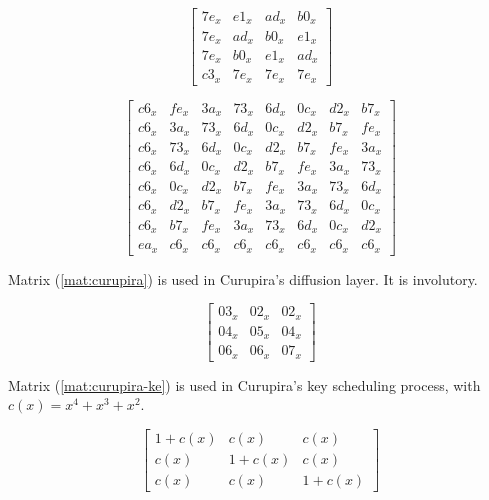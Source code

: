 \documentclass{report}
\begin{document}
\begin{equation}\label{mat:fox-mu4-inv}
\begin{bmatrix}
7e_x & e1_x & ad_x & b0_x\\
7e_x & ad_x & b0_x & e1_x\\
7e_x & b0_x & e1_x & ad_x\\
c3_x & 7e_x & 7e_x & 7e_x
\end{bmatrix}
\end{equation}

\begin{equation}\label{mat:fox-mu8-inv}
\begin{bmatrix}
c6_x & fe_x & 3a_x & 73_x & 6d_x & 0c_x & d2_x & b7_x\\
c6_x & 3a_x & 73_x & 6d_x & 0c_x & d2_x & b7_x & fe_x\\
c6_x & 73_x & 6d_x & 0c_x & d2_x & b7_x & fe_x & 3a_x\\
c6_x & 6d_x & 0c_x & d2_x & b7_x & fe_x & 3a_x & 73_x\\
c6_x & 0c_x & d2_x & b7_x & fe_x & 3a_x & 73_x & 6d_x\\
c6_x & d2_x & b7_x & fe_x & 3a_x & 73_x & 6d_x & 0c_x\\
c6_x & b7_x & fe_x & 3a_x & 73_x & 6d_x & 0c_x & d2_x\\
ea_x & c6_x & c6_x & c6_x & c6_x & c6_x & c6_x & c6_x
\end{bmatrix}
\end{equation}

Matrix (\ref{mat:curupira}) is used in Curupira's diffusion layer. It is involutory.

\begin{equation}\label{mat:curupira}
\begin{bmatrix}
03_x & 02_x & 02_x\\
04_x & 05_x & 04_x\\
06_x & 06_x & 07_x
\end{bmatrix}
\end{equation}

Matrix (\ref{mat:curupira-ke}) is used in Curupira's key scheduling process, with $c(x) = x^4 + x^3 + x^2$.

\begin{equation}\label{mat:curupira-ke}
\begin{bmatrix}
1+c(x) & c(x) & c(x)\\
c(x) & 1+c(x) & c(x)\\
c(x) & c(x) & 1+c(x)
\end{bmatrix}
\end{equation}
\end{document}
